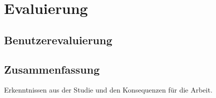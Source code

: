 \chapter{Evaluierung}

\section{Benutzerevaluierung}


\section{Zusammenfassung}
Erkenntnissen aus der Studie und den Konsequenzen für die Arbeit.